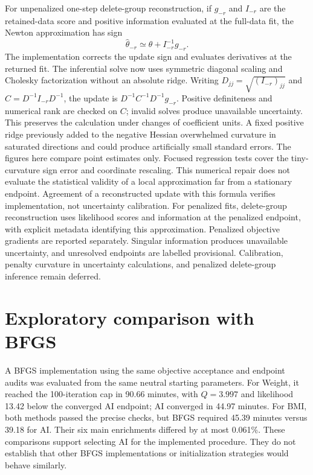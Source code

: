 \documentclass[11pt]{article}
\begin{document}
For unpenalized one-step delete-group reconstruction, if $g_{-r}$ and $I_{-r}$ are the retained-data score and positive information evaluated at the full-data fit, the Newton approximation has sign
\begin{equation}
 \widehat\theta_{-r}\simeq\widehat\theta+I_{-r}^{-1}g_{-r}.
\end{equation}
The implementation corrects the update sign and evaluates derivatives at the returned fit. The inferential solve now uses symmetric diagonal scaling and Cholesky factorization without an absolute ridge. Writing $D_{jj}=\sqrt{(I_{-r})_{jj}}$ and $C=D^{-1}I_{-r}D^{-1}$, the update is $D^{-1}C^{-1}D^{-1}g_{-r}$. Positive definiteness and numerical rank are checked on $C$; invalid solves produce unavailable uncertainty. This preserves the calculation under changes of coefficient units. A fixed positive ridge previously added to the negative Hessian overwhelmed curvature in saturated directions and could produce artificially small standard errors. The figures here compare point estimates only. Focused regression tests cover the tiny-curvature sign error and coordinate rescaling. This numerical repair does not evaluate the statistical validity of a local approximation far from a stationary endpoint. Agreement of a reconstructed update with this formula verifies implementation, not uncertainty calibration. For penalized fits, delete-group reconstruction uses likelihood scores and information at the penalized endpoint, with explicit metadata identifying this approximation. Penalized objective gradients are reported separately. Singular information produces unavailable uncertainty, and unresolved endpoints are labelled provisional. Calibration, penalty curvature in uncertainty calculations, and penalized delete-group inference remain deferred.

\appendix
\section{Exploratory comparison with BFGS}
A BFGS implementation using the same objective acceptance and endpoint audits was evaluated from the same neutral starting parameters. For Weight, it reached the 100-iteration cap in 90.66 minutes, with $Q=3.997$ and likelihood 13.42 below the converged AI endpoint; AI converged in 44.97 minutes. For BMI, both methods passed the precise checks, but BFGS required 45.39 minutes versus 39.18 for AI. Their six main enrichments differed by at most 0.061\%. These comparisons support selecting AI for the implemented procedure. They do not establish that other BFGS implementations or initialization strategies would behave similarly.
\end{document}
